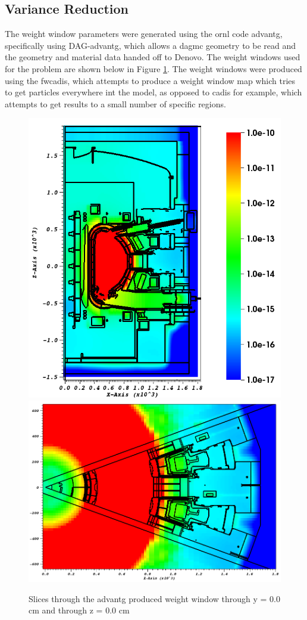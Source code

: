 \documentclass[12pt]{article}
\begin{document}
\subsection{Variance Reduction}
The weight window parameters were generated using the \gls{ornl} code
\gls{advantg}, specifically using DAG-\gls{advantg}, which allows a
\gls{dagmc} geometry to be read and the geometry and material data handed off to
Denovo. The weight windows used for the problem are shown below in Figure
\ref{fig:wwinp}. The weight windows were produced using the \gls{fwcadis},
which attempts to produce a weight window map which tries to get particles
everywhere int the model, as opposed to \gls{cadis} for example, which
attempts to get results to a small number of specific regions.
\begin{figure}[ht!]
  \centering
  \includegraphics[scale=0.4]{../plots/wwinp/wwinp_y0.png}
  \includegraphics[scale=0.3]{../plots/wwinp/wwinp_z0.png}
  \caption{Slices through the \gls{advantg} produced weight window through y =
  0.0 cm and through z = 0.0 cm}
  \label{fig:wwinp}
\end{figure}
\end{document}
